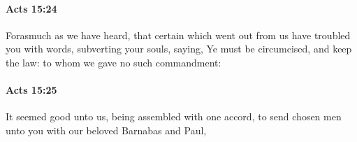 		\paragraph{Acts 15:24} %
			\label{ACTS-15-24}

			Forasmuch as we have heard, that certain which went out from us have troubled you with words, subverting your souls, saying, Ye must be circumcised, and keep the law: to whom we gave no such commandment:

			\begin{framed}
			\scriptsize
				\begin{compactdesc}
					\item[SBLG] 
				\end{compactdesc}
			\end{framed}

		\paragraph{Acts 15:25} %
			\label{ACTS-15-25}

			It seemed good unto us, being assembled with one accord, to send chosen men unto you with our beloved Barnabas and Paul,

